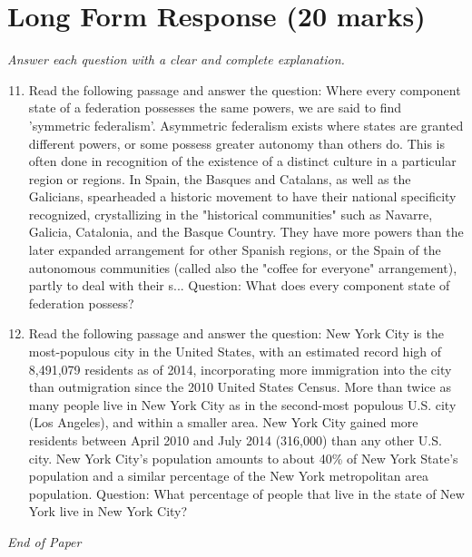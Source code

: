 \documentclass[12pt]{article}
\begin{document}
\section*{Long Form Response (20 marks)}
\textit{Answer each question with a clear and complete explanation.}
\begin{enumerate}[label=\arabic*.]
\setcounter{enumi}{10}
\item Read the following passage and answer the question: Where every component state of a federation possesses the same powers, we are said to find 'symmetric federalism'. Asymmetric federalism exists where states are granted different powers, or some possess greater autonomy than others do. This is often done in recognition of the existence of a distinct culture in a particular region or regions. In Spain, the Basques and Catalans, as well as the Galicians, spearheaded a historic movement to have their national specificity recognized, crystallizing in the "historical communities" such as Navarre, Galicia, Catalonia, and the Basque Country. They have more powers than the later expanded arrangement for other Spanish regions, or the Spain of the autonomous communities (called also the "coffee for everyone" arrangement), partly to deal with their s... Question: What does every component state of federation possess?
\item Read the following passage and answer the question: New York City is the most-populous city in the United States, with an estimated record high of 8,491,079 residents as of 2014, incorporating more immigration into the city than outmigration since the 2010 United States Census. More than twice as many people live in New York City as in the second-most populous U.S. city (Los Angeles), and within a smaller area. New York City gained more residents between April 2010 and July 2014 (316,000) than any other U.S. city. New York City's population amounts to about 40\% of New York State's population and a similar percentage of the New York metropolitan area population. Question: What percentage of people that live in the state of New York live in New York City?
\end{enumerate}

\vfill
\noindent\textit{End of Paper}
\end{document}
